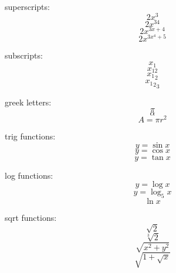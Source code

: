 \documentclass[12pt]{article}
\begin{document}
superscripts: $$2x^3$$
$$2x^{34}$$
$$2x^{3x+4}$$
$$2x^{3x^4+5}$$

subscripts: 
$$x_1$$
$$x_{12}$$
$${x_1}_2$$
$${{x_1}_2}_3$$

greek letters:
$$\pi$$
$$\alpha$$
$$A=\pi r^2$$

trig functions:
$$y=\sin{x}$$
$$y=\cos{x}$$
$$y=\tan{x}$$

log functions:
$$y=\log{x}$$
$$y=\log_5{x}$$
$$\ln{x}$$

sqrt functions:
$$\sqrt{2}$$
$$\sqrt[3]{2}$$
$$\sqrt{x^2+y^2}$$
$$\sqrt{1+\sqrt{x}}$$
\end{document}
